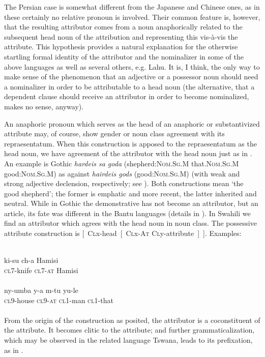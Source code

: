 The Persian case is somewhat different from the Japanese and Chinese ones, as in these certainly no relative pronoun is involved. Their common feature is, however, that the resulting attributor comes from a noun anaphorically related to the subsequent head noun of the attribution and representing this vis-à-vis the attribute. This hypothesis provides a natural explanation for the otherwise startling formal identity of the attributor and the nominalizer in some of the above languages as well as several others, e.g. Lahu. It is, I think, the only way to make sense of the phenomenon that an adjective or a possessor noun should need a nominalizer in order to be attributable to a head noun (the alternative, that a dependent clause should receive an attributor in order to become nominalized, makes no sense, anyway).

An anaphoric pronoun which serves as the head of an anaphoric or substantivized attribute may, of course, show gender or noun class agreement with its repraesentatum. When this construction is apposed to the repraesentatum as the head noun, we have agreement of the attributor with the head noun just as in . An example is Gothic \textit{hardeis sa goda} (shepherd:\textsc{Nom.Sg.M} that.\textsc{Nom.Sg.M} good:\textsc{Nom.Sg.M}) as against \textit{hairdeis gods} (good:\textsc{Nom.Sg.M}) (with weak and strong adjective declension, respectively; see \citealt[110]{Ramat1980}). Both constructions mean ‘the good shepherd’; the former is emphatic and more recent, the latter inherited and neutral. While in Gothic the demonstrative has not become an attributor, but an article, its fate was different in the Bantu languages (details in \citealt[§~7.2]{Lehmann1982b}). In Swahili we find an attributor which agrees with the head noun in noun class. The possessive attribute construction is [~\textsc{Cl}x-head~[~\textsc{Cl}x-\textsc{At} \textsc{Cl}y-attribute~]~]. Examples:

\ea\label{ex:E43}
 \\
 \ea
 \gll  ki-su  ch-a  Hamisi\\
  \textsc{cl}7-knife  \textsc{cl}7-\textsc{at}  Hamisi\\
\\
\ex
\gll  ny-umba  y-a  m-tu  yu-le\\
\textsc{cl}9-house  \textsc{cl}9-\textsc{at}  \textsc{cl}1-man  \textsc{cl}1-that\\
\\
\z
\z 
\noindent From the origin of the construction as posited, the attributor is a coconstituent of the attribute. It becomes clitic to the attribute; and further grammaticalization, which may be observed in the related language Tswana, leads to its prefixation, as in .

